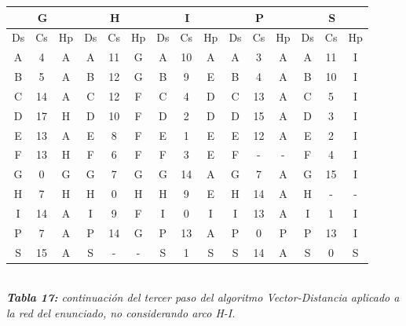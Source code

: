 \documentclass[letterpaper,10pt,onecolumn,titlepage]{article}
\begin{document}
  \begin{center}
   \begin{tabular}{|c|c|c|c|c|c|c|c|c|c|c|c|c|c|c|} \hline
     \multicolumn{3}{|c|}{G} & \multicolumn{3}{|c|}{H} &\multicolumn{3}{|c|}{I} & \multicolumn{3}{|c|}{P} & \multicolumn{3}{|c|}{S}    \\ \hline
     Ds & Cs & Hp & Ds & Cs & Hp & Ds & Cs & Hp & Ds & Cs & Hp & Ds & Cs & Hp  \\ \hline
     A  & 4  & A  & A  & 11  & G  & A  & 10  & A  & A  & 3  & A  & A  & 11  & I   \\ \hline
     B  & 5  & A  & B  & \color{red}12  & \color{red}G  & B  & 9  & E  & B  & 4  & A  & B  & \color{red}10  &\color{red} I   \\ \hline
     C  & \color{red}14  &\color{red} A  & C  & \color{red}12  &\color{red} F  & C  & 4  & D  & C  & \color{red}13  &\color{red} A  & C  & \color{red}5  & \color{red}I \\ \hline
     D  & \color{red}17  &\color{red} H  & D  & 10  & F  & D  & 2  & D  & D  & \color{red}15  & \color{red}A  & D  & 3  & I   \\ \hline
     E  & \color{red}13  & \color{red}A  & E  & 8  & F  & E  & 1  & E  & E  & \color{red}12  & \color{red}A  & E  & 2  & I   \\ \hline
     F  & 13  & H  & F  & 6  & F  & F  & 3  & E  & F  & -  & -  & F  & \color{red}4  &\color{red} I   \\ \hline
     G  & 0  & G  & G  & 7  & G  & G  & 14  & A  & G  & 7  & A  & G  & \color{red}15  &\color{red} I   \\ \hline
     H  & 7  & H  & H  & 0  & H  & H  & \color{red}9  &\color{red} E  & H  & \color{red}14  & \color{red}A  & H  & -  & -   \\ \hline
     I  & 14  & A  & I  & \color{red}9  & \color{red}F  & I  & 0  & I  & I  & 13  & A  & I  & 1  & I   \\ \hline
     P  & 7  & A  & P  & \color{red}14  & \color{red}G  & P  & 13  & A  & P  & 0  & P  & P  & \color{red}13  &\color{red} I \\ \hline
     S  & \color{red}15  &\color{red} A  & S  & -  & -  & S  & 1  & S  & S  & \color{red}14  & \color{red}A  & S  & 0  & S   \\ \hline
   \end{tabular}\\
   \textit{\textbf{Tabla 17:} continuación del tercer paso del algoritmo Vector-Distancia aplicado a la red del enunciado, no considerando arco H-I.}
 \end{center}
 
\end{document}
